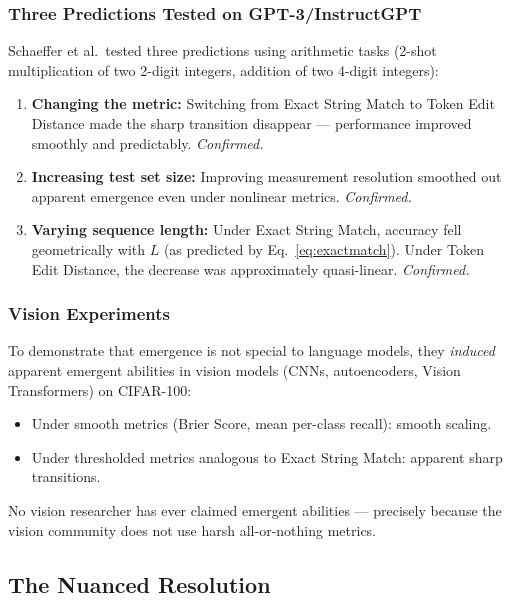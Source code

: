 \documentclass[11pt, a4paper]{article}
\theoremstyle{definition}
\theoremstyle{plain}
\begin{document}
\subsubsection{Three Predictions Tested on GPT-3/InstructGPT}

Schaeffer et al.\ tested three predictions using arithmetic tasks (2-shot multiplication of two 2-digit integers, addition of two 4-digit integers):

\begin{enumerate}
  \item \textbf{Changing the metric:} Switching from Exact String Match to Token Edit Distance made the sharp transition disappear --- performance improved smoothly and predictably. \textit{Confirmed.}
  \item \textbf{Increasing test set size:} Improving measurement resolution smoothed out apparent emergence even under nonlinear metrics. \textit{Confirmed.}
  \item \textbf{Varying sequence length:} Under Exact String Match, accuracy fell geometrically with $L$ (as predicted by Eq.~\ref{eq:exactmatch}). Under Token Edit Distance, the decrease was approximately quasi-linear. \textit{Confirmed.}
\end{enumerate}

\subsubsection{Vision Experiments}

To demonstrate that emergence is not special to language models, they \emph{induced} apparent emergent abilities in vision models (CNNs, autoencoders, Vision Transformers) on CIFAR-100:
\begin{itemize}
  \item Under smooth metrics (Brier Score, mean per-class recall): smooth scaling.
  \item Under thresholded metrics analogous to Exact String Match: apparent sharp transitions.
\end{itemize}
No vision researcher has ever claimed emergent abilities --- precisely because the vision community does not use harsh all-or-nothing metrics.

\subsection{The Nuanced Resolution}
\end{document}
